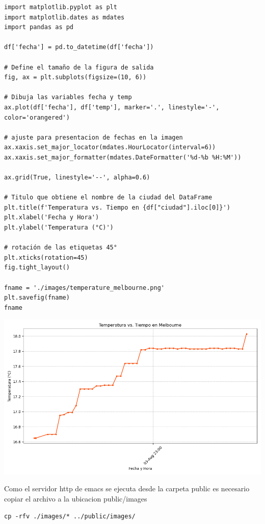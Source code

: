 \documentclass[11pt]{article}
\begin{document}
\begin{verbatim}
import matplotlib.pyplot as plt
import matplotlib.dates as mdates
import pandas as pd

df['fecha'] = pd.to_datetime(df['fecha'])

# Define el tamaño de la figura de salida
fig, ax = plt.subplots(figsize=(10, 6))

# Dibuja las variables fecha y temp
ax.plot(df['fecha'], df['temp'], marker='.', linestyle='-', color='orangered')

# ajuste para presentacion de fechas en la imagen
ax.xaxis.set_major_locator(mdates.HourLocator(interval=6))
ax.xaxis.set_major_formatter(mdates.DateFormatter('%d-%b %H:%M'))

ax.grid(True, linestyle='--', alpha=0.6)

# Titulo que obtiene el nombre de la ciudad del DataFrame
plt.title(f'Temperatura vs. Tiempo en {df["ciudad"].iloc[0]}')
plt.xlabel('Fecha y Hora')
plt.ylabel('Temperatura (°C)')

# rotación de las etiquetas 45°
plt.xticks(rotation=45)
fig.tight_layout()

fname = './images/temperature_melbourne.png'
plt.savefig(fname)
fname
\end{verbatim}

\begin{center}
\includegraphics[width=.9\linewidth]{./images/temperature_melbourne.png}
\end{center}

Como el servidor http de emacs se ejecuta desde la carpeta public
es necesario copiar el archivo a la ubicacion public/images

\begin{verbatim}
cp -rfv ./images/* ../public/images/
\end{verbatim}
\end{document}
